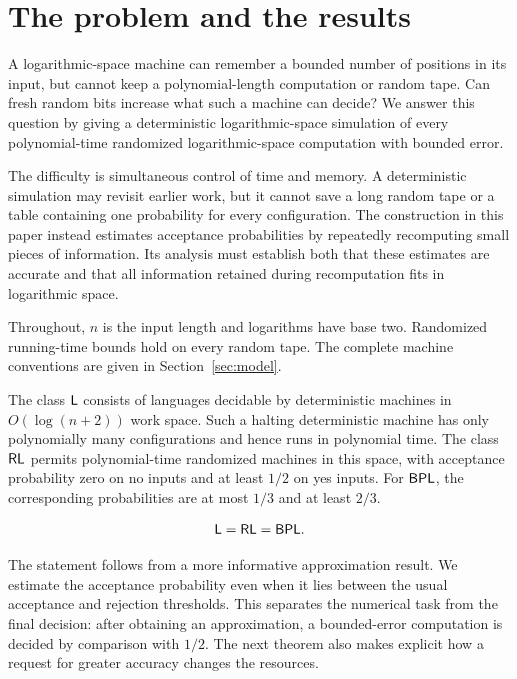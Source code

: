\section{The problem and the results}\label{sec:intro}

A logarithmic-space machine can remember a bounded number of positions
in its input, but cannot keep a polynomial-length computation or random
tape. Can fresh random bits increase what such a machine can decide?
We answer this question by giving a deterministic logarithmic-space
simulation of every polynomial-time randomized logarithmic-space
computation with bounded error.

The difficulty is simultaneous control of time and memory. A deterministic simulation may revisit earlier work, but it cannot save a long random tape or a table containing one probability for every configuration. The construction in this paper instead estimates acceptance probabilities by repeatedly recomputing small pieces of information. Its analysis must establish both that these estimates are accurate and that all information retained during recomputation fits in logarithmic space.

Throughout, $n$ is the input length and logarithms have base two. Randomized running-time bounds hold on every random tape. The complete machine conventions are given in Section~\ref{sec:model}.

The class $\mathsf L$ consists of languages decidable by deterministic
machines in $O(\log(n+2))$ work space. Such a halting deterministic
machine has only polynomially many configurations and hence runs in
polynomial time. The class $\mathsf{RL}$ permits
polynomial-time randomized machines in this space, with acceptance
probability zero on no inputs and at least $1/2$ on yes inputs.
For $\mathsf{BPL}$, the corresponding probabilities are at most $1/3$ and at
least $2/3$.

\begin{theorem}\label{thm:main}
\[
                 \mathsf L=\mathsf{RL}=\mathsf{BPL}.
\]
\end{theorem}

The statement follows from a more informative approximation result. We estimate the acceptance probability even when it lies between the usual acceptance and rejection thresholds. This separates the numerical task from the final decision: after obtaining an approximation, a bounded-error computation is decided by comparison with $1/2$. The next theorem also makes explicit how a request for greater accuracy changes the resources.

